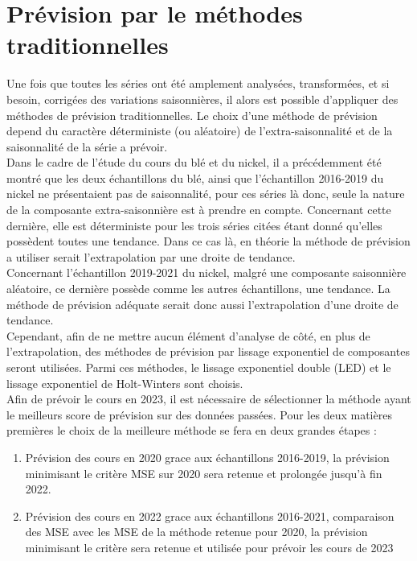 \section{Prévision par le méthodes traditionnelles}\label{tradi}
Une fois que toutes les séries ont été amplement analysées, transformées, et si besoin, corrigées des variations saisonnières, il alors est possible d'appliquer des 
méthodes de prévision traditionnelles. Le choix d'une méthode de prévision depend du caractère déterministe (ou aléatoire) de l'extra-saisonnalité et de la saisonnalité de
la série a prévoir. \\[11pt]
Dans le cadre de l'étude du cours du blé et du nickel, il a précédemment été montré que les deux échantillons du blé, ainsi que l'échantillon 2016-2019 
du nickel ne présentaient pas de saisonnalité, pour ces séries là donc, seule la nature de la composante extra-saisonnière est à prendre en compte. Concernant cette 
dernière, elle est déterministe pour les trois séries citées étant donné qu'elles possèdent toutes une tendance. Dans ce cas là, en théorie la méthode de prévision a 
utiliser serait l'extrapolation par une droite de tendance.\\[11pt]
Concernant l'échantillon 2019-2021 du nickel, malgré une composante saisonnière aléatoire, ce dernière possède comme les autres échantillons, une tendance. La méthode de 
prévision adéquate serait donc aussi l'extrapolation d'une droite de tendance.\\[11pt]
Cependant, afin de ne mettre aucun élément d'analyse de côté, en plus de l'extrapolation, des méthodes de prévision par lissage exponentiel de composantes seront 
utilisées. Parmi ces méthodes, le lissage exponentiel double (LED) et le lissage exponentiel de Holt-Winters sont choisis. \\[11pt]
Afin de prévoir le cours en 2023, il est nécessaire de sélectionner la méthode ayant le meilleurs score de prévision sur des données passées. Pour les deux matières 
premières le choix de la meilleure méthode se fera en deux grandes étapes :
\begin{enumerate}
    \item Prévision des cours en 2020 grace aux échantillons 2016-2019, la prévision minimisant le critère MSE sur 2020 sera retenue et prolongée jusqu'à fin 2022.
    \item Prévision des cours en 2022 grace aux échantillons 2016-2021, comparaison des MSE avec les MSE de la méthode retenue pour 2020, la prévision minimisant le 
            critère sera retenue et utilisée pour prévoir les cours de 2023 
\end{enumerate}

